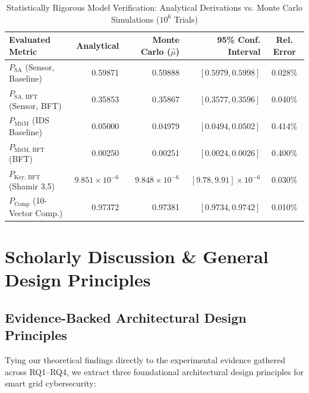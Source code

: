 \documentclass[10pt,twocolumn,journal]{IEEEtran}
\begin{document}
\begin{table}[h]
\caption{Statistically Rigorous Model Verification: Analytical Derivations vs. Monte Carlo Simulations ($10^6$ Trials)}
\label{tab:monte_carlo}
\centering
\scriptsize
\begin{tabular}{@{}lrrrc@{}}
\toprule
\textbf{Evaluated Metric} & \textbf{Analytical} & \textbf{Monte Carlo ($\hat{\mu}$)} & \textbf{95\% Conf. Interval} & \textbf{Rel. Error} \\
\midrule
$P_{\text{SA}}$ (Sensor, Baseline) & 0.59871 & 0.59888 & $[0.5979, 0.5998]$ & 0.028\% \\
$P_{\text{SA, BFT}}$ (Sensor, BFT) & 0.35853 & 0.35867 & $[0.3577, 0.3596]$ & 0.040\% \\
$P_{\text{MitM}}$ (IDS Baseline) & 0.05000 & 0.04979 & $[0.0494, 0.0502]$ & 0.414\% \\
$P_{\text{MitM, BFT}}$ (BFT) & 0.00250 & 0.00251 & $[0.0024, 0.0026]$ & 0.400\% \\
$P_{\text{Key, BFT}}$ (Shamir 3,5) & $9.851 \times 10^{-6}$ & $9.848 \times 10^{-6}$ & $[9.78, 9.91] \times 10^{-6}$ & 0.030\% \\
$P_{\text{Comp}}$ (10-Vector Comp.) & 0.97372 & 0.97381 & $[0.9734, 0.9742]$ & 0.010\% \\
\bottomrule
\end{tabular}
\end{table}

\section{Scholarly Discussion & General Design Principles}
\label{sec:discussion}

\subsection{Evidence-Backed Architectural Design Principles}
Tying our theoretical findings directly to the experimental evidence gathered across RQ1--RQ4, we extract three foundational architectural design principles for smart grid cybersecurity:
\end{document}
